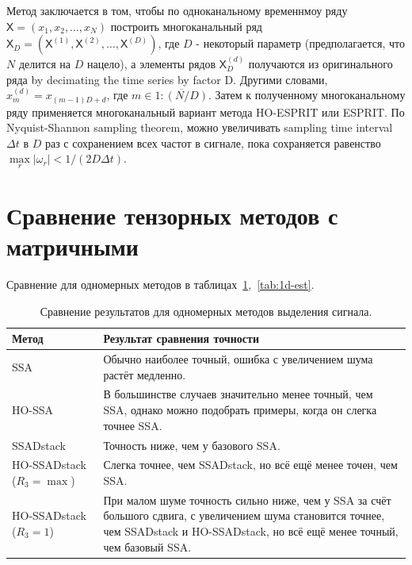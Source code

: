 \documentclass[12pt]{article}
\newcommand{\tX}{\mathsf{X}}
\theoremstyle{definition}
\theoremstyle{remark}
\begin{document}
Метод заключается в том, чтобы по одноканальному временнмоу ряду
$\tX = (x_1, x_2, \ldots, x_N)$ построить многоканальный ряд
$\tX_D = (\tX^{(1)}, \tX^{(2)}, \ldots, \tX^{(D)})$,
где $D$ - некоторый параметр (предполагается, что $N$ делится на $D$ нацело),
а элементы рядов $\tX_D^{(d)}$ получаются из оригинального ряда by
decimating the time series by factor D.
Другими словами, $x_m^{(d)} = x_{(m-1)D + d}$, где $m \in \overline{1:(N/D)}$.
Затем к полученному многоканальному ряду применяется многоканальный
вариант метода HO-ESPRIT или ESPRIT.
По Nyquist-Shannon sampling theorem, можно увеличивать sampling time
interval $\Delta t$ в $D$ раз с сохранением всех частот в сигнале, пока
сохраняется равенство $\max\limits_{r}\left|\omega_r\right| < 1 / (2
D \Delta t)$.


\section{Сравнение тензорных методов с матричными}
Сравнение для одномерных методов в таблицах~\ref{tab:1d-rec},~\ref{tab:1d-est}.
\begin{table}[!ht]
  \centering
  \caption{Сравнение результатов для одномерных методов выделения сигнала.}
  \label{tab:1d-rec}
  \begin{tabularx}{\textwidth}{|p{32mm}|X|} \hline
    Метод & Результат сравнения точности \\ \hline
    SSA & Обычно наиболее точный, ошибка с увеличением шума растёт
    медленно. \\ \hline
    HO-SSA & В большинстве случаев значительно менее точный, чем SSA, однако
    можно подобрать примеры, когда он слегка точнее SSA.\\ \hline
    SSADstack & Точность ниже, чем у базового SSA. \\ \hline
    HO-SSADstack ($R_3 = \max$) & Слегка точнее, чем SSADstack, но всё ещё
    менее точен, чем SSA.  \\ \hline
    HO-SSADstack ($R_3 = 1$)& При малом шуме точность сильно ниже,
    чем у SSA за счёт большого сдвига, с увеличением шума становится точнее, чем
    SSADstack и HO-SSADstack, но всё ещё менее точный, чем базовый SSA.\\ \hline
  \end{tabularx}
\end{table}
\end{document}
